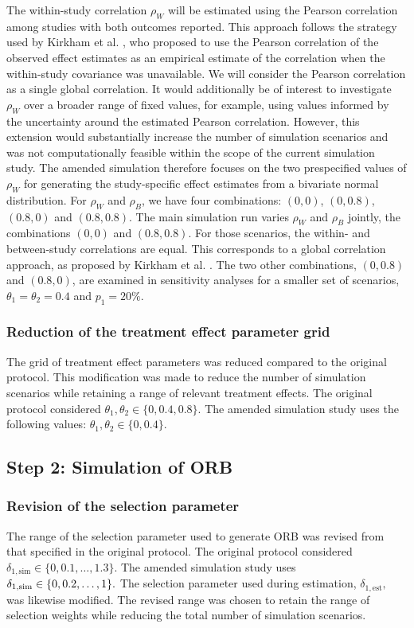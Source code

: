 \documentclass[11pt]{article}
\begin{document}
The within-study correlation $\rho_W$ will be estimated using the Pearson correlation among studies with both outcomes reported. This approach follows the strategy used by Kirkham et al. \cite{kirkham2012multivariate}, who proposed to use the Pearson correlation of the observed effect estimates as an empirical estimate of the correlation when the within-study covariance was unavailable. We will consider the Pearson correlation as a single global correlation. It would additionally be of interest to investigate $\rho_W$ over a broader range of fixed values, for example, using values informed by the uncertainty around the estimated Pearson correlation. However, this extension would substantially increase the number of simulation scenarios and was not computationally feasible within the scope of the current simulation study. The amended simulation therefore focuses on the two prespecified values of $\rho_W$ for generating the study-specific effect estimates from a bivariate normal distribution. For $\rho_W$ and $\rho_B$, we have four combinations: $(0, 0)$, $(0, 0.8)$, $(0.8, 0)$ and $(0.8, 0.8)$. The main simulation run varies $\rho_W$ and $\rho_B$ jointly, \ie the combinations $(0, 0)$ and $(0.8, 0.8)$. For those scenarios, the within- and between-study correlations are equal. This corresponds to a global correlation approach, as proposed by Kirkham et al. \cite{kirkham2012multivariate}. The two other combinations, \ie $(0, 0.8)$ and $(0.8, 0)$, are examined in sensitivity analyses for a smaller set of scenarios, \ie $\theta_1 = \theta_2 = 0.4$ and $p_1 = 20\%$.

\subsubsection{Reduction of the treatment effect parameter grid}
The grid of treatment effect parameters was reduced compared to the original protocol. This modification was made to reduce the number of simulation scenarios while retaining a range of relevant treatment effects. The original protocol considered $\theta_1,\theta_2 \in \{0,0.4,0.8\}.$ The amended simulation study uses the following values: $\theta_1,  \theta_2 \in \{0, 0.4\}.$ 

\subsection{Step 2: Simulation of ORB}
\subsubsection{Revision of the selection parameter}
The range of the selection parameter used to generate ORB was revised from that specified in the original protocol.
The original protocol considered $\delta_{1,\mathrm{sim}} \in \{0,0.1,\ldots,1.3\}.$ The amended simulation study uses
$\delta_{1,\mathrm{sim}} \in {\text\{0, 0.2,\ldots, 1\}}.$ The selection parameter used during estimation, $\delta_{1,\mathrm{est}},$ was likewise modified.
The revised range was chosen to retain the range of selection weights while reducing the total number of simulation scenarios.
\end{document}
